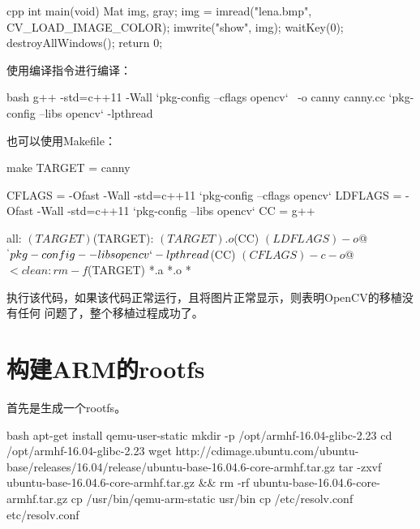 \begin{outline}[enumerate]
\begin{code-in-enumerate}{cpp}
int main(void)
{
        Mat img, gray;
        img = imread("lena.bmp", CV_LOAD_IMAGE_COLOR);
        imwrite("show", img);
        waitKey(0);
        destroyAllWindows();
        return 0;
}
\end{code-in-enumerate}

使用编译指令进行编译：
\begin{code-in-enumerate}{bash}
g++ -std=c++11 -Wall `pkg-config --cflags opencv` \
    -o canny canny.cc  `pkg-config --libs opencv` -lpthread
\end{code-in-enumerate}

也可以使用Makefile：
\begin{code-in-enumerate}{make}
TARGET = canny

CFLAGS = -Ofast -Wall -std=c++11 `pkg-config --cflags opencv`
LDFLAGS = -Ofast -Wall -std=c++11 `pkg-config --libs opencv`
CC = g++

all: $(TARGET)

$(TARGET): $(TARGET).o
        $(CC) $(LDFLAGS) -o $@ $^ `pkg-config --libs opencv` -lpthread

        $(CC) $(CFLAGS) -c -o $@ $<

clean:
        rm -f $(TARGET) *.a *.o *~
\end{code-in-enumerate}

执行该代码，如果该代码正常运行，且将图片正常显示，则表明OpenCV的移植没有任何
问题了，整个移植过程成功了。

\end{outline}

\section{构建ARM的rootfs}
首先是生成一个rootfs。
\begin{code-block}{bash}
apt-get install qemu-user-static
mkdir -p /opt/armhf-16.04-glibc-2.23
cd /opt/armhf-16.04-glibc-2.23
wget http://cdimage.ubuntu.com/ubuntu-base/releases/16.04/release/ubuntu-base-16.04.6-core-armhf.tar.gz
tar -zxvf ubuntu-base-16.04.6-core-armhf.tar.gz && rm -rf ubuntu-base-16.04.6-core-armhf.tar.gz
cp /usr/bin/qemu-arm-static usr/bin
cp /etc/resolv.conf etc/resolv.conf
\end{code-block}

